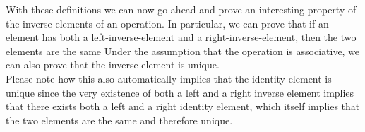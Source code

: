 With these definitions we can now go ahead and prove an interesting property of the inverse elements of an operation. In particular, we can prove that
if an element has both a left-inverse-element and a right-inverse-element, then the two elements are the same Under the assumption that the operation is 
associative, we can also prove that the inverse element is unique. \\

Please note how this also automatically implies that the identity element is unique since 
the very existence of both a left and a right inverse element implies that there exists both a left and a right identity element, which itself implies that 
the two elements are the same and therefore unique. 